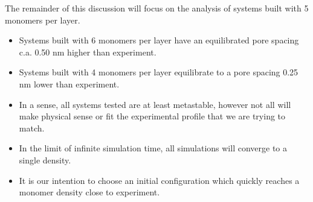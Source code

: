\documentclass{article}
\begin{document}

  The remainder of this discussion will focus on the analysis of systems built with
  5 monomers per layer. 
  \begin{itemize}
	  	\item Systems built with 6 monomers per layer have an equilibrated
  		pore spacing c.a. 0.50 nm higher than experiment. 
  		\item Systems built with 4 monomers per layer equilibrate to a pore spacing 0.25 nm 
  		lower than experiment. 
  		\item In a sense, all systems tested are at least metastable, however not all will make 
  		physical sense or fit the experimental profile that we are trying to match.
  		\item In the limit of infinite simulation time, all simulations will converge to a 	
  		single density.
  		\item It is our intention to choose an initial configuration which quickly reaches a 
  		monomer density close to experiment.
  \end{itemize} 
\end{document}
